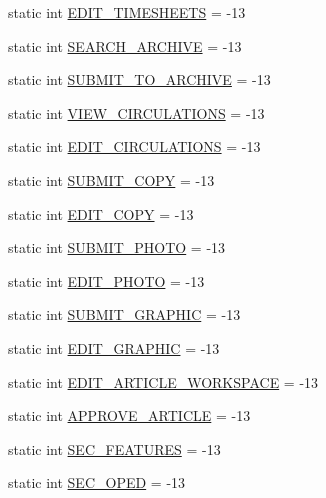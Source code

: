 \begin{DoxyCompactItemize}
\item 
static int \hyperlink{class_permission_def_ab06f1ead6cb7f1ebddead29fde57d275}{E\+D\+I\+T\+\_\+\+T\+I\+M\+E\+S\+H\+E\+E\+T\+S} = -\/13
\item 
static int \hyperlink{class_permission_def_aba007cba3012711081c56ba5ae5ce29f}{S\+E\+A\+R\+C\+H\+\_\+\+A\+R\+C\+H\+I\+V\+E} = -\/13
\item 
static int \hyperlink{class_permission_def_ae97ce76e02950ecd4b83a1ae4457ea98}{S\+U\+B\+M\+I\+T\+\_\+\+T\+O\+\_\+\+A\+R\+C\+H\+I\+V\+E} = -\/13
\item 
static int \hyperlink{class_permission_def_a30ad53e715b473ba87cb40a4f42ccb14}{V\+I\+E\+W\+\_\+\+C\+I\+R\+C\+U\+L\+A\+T\+I\+O\+N\+S} = -\/13
\item 
static int \hyperlink{class_permission_def_ac2c43cba3ea6ce62dcea5db230ca80ca}{E\+D\+I\+T\+\_\+\+C\+I\+R\+C\+U\+L\+A\+T\+I\+O\+N\+S} = -\/13
\item 
static int \hyperlink{class_permission_def_a3faac19b2db9a5f8ccef5f17a14f2a37}{S\+U\+B\+M\+I\+T\+\_\+\+C\+O\+P\+Y} = -\/13
\item 
static int \hyperlink{class_permission_def_a6c3f8505e84ee1a8f140e32ff6d61ab4}{E\+D\+I\+T\+\_\+\+C\+O\+P\+Y} = -\/13
\item 
static int \hyperlink{class_permission_def_a8259520eacefd1cfc169ad49b5a0f615}{S\+U\+B\+M\+I\+T\+\_\+\+P\+H\+O\+T\+O} = -\/13
\item 
static int \hyperlink{class_permission_def_ae0a398361104faddcbb5d1c2d4f3de0f}{E\+D\+I\+T\+\_\+\+P\+H\+O\+T\+O} = -\/13
\item 
static int \hyperlink{class_permission_def_a82405ec2b7466362ec3f3da90f469e45}{S\+U\+B\+M\+I\+T\+\_\+\+G\+R\+A\+P\+H\+I\+C} = -\/13
\item 
static int \hyperlink{class_permission_def_a49c0abff41243bfa22159a4d061a215e}{E\+D\+I\+T\+\_\+\+G\+R\+A\+P\+H\+I\+C} = -\/13
\item 
static int \hyperlink{class_permission_def_a054ae810045de9f9d0adb57e6afefea9}{E\+D\+I\+T\+\_\+\+A\+R\+T\+I\+C\+L\+E\+\_\+\+W\+O\+R\+K\+S\+P\+A\+C\+E} = -\/13
\item 
static int \hyperlink{class_permission_def_a142ffafaaae9159dfad5ba89ae6fd5a2}{A\+P\+P\+R\+O\+V\+E\+\_\+\+A\+R\+T\+I\+C\+L\+E} = -\/13
\item 
static int \hyperlink{class_permission_def_a8eb55ddbf0475b6cc451036af169b36d}{S\+E\+C\+\_\+\+F\+E\+A\+T\+U\+R\+E\+S} = -\/13
\item 
static int \hyperlink{class_permission_def_a9fb34caadb04f7710eee731ccd706495}{S\+E\+C\+\_\+\+O\+P\+E\+D} = -\/13

\end{DoxyCompactItemize}
